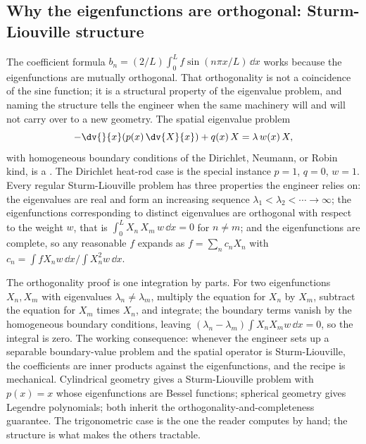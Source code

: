 

\subsection{Why the eigenfunctions are orthogonal: Sturm-Liouville structure}

The coefficient formula $b_{n} = (2/L)\int_{0}^{L} f \sin(n\pi
x/L)\,\dd x$ works because the eigenfunctions are mutually
orthogonal. That orthogonality is not a coincidence of the sine
function; it is a structural property of the eigenvalue problem,
and naming the structure tells the engineer when the same machinery
will and will not carry over to a new geometry. The spatial
eigenvalue problem
\[
-\dv{}{x}\!\left(p(x)\,\dv{X}{x}\right) + q(x)\, X = \lambda\, w(x)\, X,
\]
with homogeneous boundary conditions of the Dirichlet, Neumann, or
Robin kind, is a . The
Dirichlet heat-rod case is the special instance $p = 1$, $q = 0$,
$w = 1$. Every regular Sturm-Liouville problem has three properties
the engineer relies on: the eigenvalues are real and form an
increasing sequence $\lambda_{1} < \lambda_{2} < \cdots \to
\infty$; the eigenfunctions corresponding to distinct eigenvalues
are orthogonal with respect to the weight $w$, that is
$\int_{0}^{L} X_{n}\, X_{m}\, w\,\dd x = 0$ for $n \neq m$; and the
eigenfunctions are complete, so any reasonable $f$ expands as
$f = \sum_{n} c_{n} X_{n}$ with $c_{n} = \int f X_{n} w\,\dd x /
\int X_{n}^{2} w\,\dd x$.

The orthogonality proof is one integration by parts. For two
eigenfunctions $X_{n}, X_{m}$ with eigenvalues $\lambda_{n} \neq
\lambda_{m}$, multiply the equation for $X_{n}$ by $X_{m}$, subtract
the equation for $X_{m}$ times $X_{n}$, and integrate; the boundary
terms vanish by the homogeneous boundary conditions, leaving
$(\lambda_{n} - \lambda_{m})\int X_{n} X_{m} w\,\dd x = 0$, so the
integral is zero. The working consequence: whenever the engineer
sets up a separable boundary-value problem and the spatial operator
is Sturm-Liouville, the coefficients are inner products against the
eigenfunctions, and the recipe is mechanical. Cylindrical geometry
gives a Sturm-Liouville problem with $p(x) = x$ whose eigenfunctions
are Bessel functions; spherical geometry gives Legendre polynomials;
both inherit the orthogonality-and-completeness guarantee. The
trigonometric case is the one the reader computes by hand; the
structure is what makes the others tractable.

